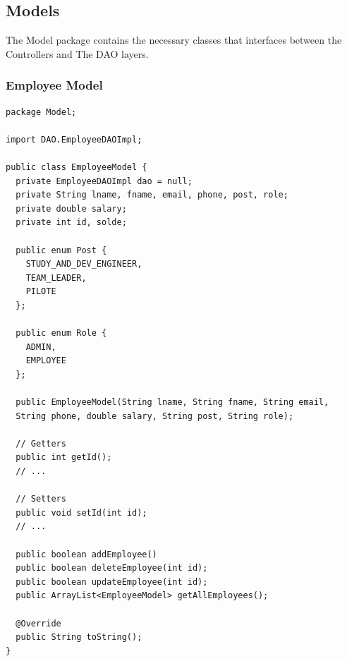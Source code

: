 \documentclass[12pt]{article}
\begin{document}
\subsection{Models}

The Model package contains the necessary classes that interfaces
between the Controllers and The DAO layers.

\subsubsection{Employee Model}
\begin{lstlisting}
package Model;

import DAO.EmployeeDAOImpl;

public class EmployeeModel {
  private EmployeeDAOImpl dao = null;
  private String lname, fname, email, phone, post, role;
  private double salary;
  private int id, solde;

  public enum Post {
    STUDY_AND_DEV_ENGINEER,
    TEAM_LEADER,
    PILOTE
  };

  public enum Role {
    ADMIN,
    EMPLOYEE
  };

  public EmployeeModel(String lname, String fname, String email,
  String phone, double salary, String post, String role);

  // Getters
  public int getId();
  // ...

  // Setters
  public void setId(int id);
  // ...

  public boolean addEmployee()
  public boolean deleteEmployee(int id);
  public boolean updateEmployee(int id);
  public ArrayList<EmployeeModel> getAllEmployees();

  @Override
  public String toString();
}
\end{lstlisting}

\pagebreak
\end{document}
